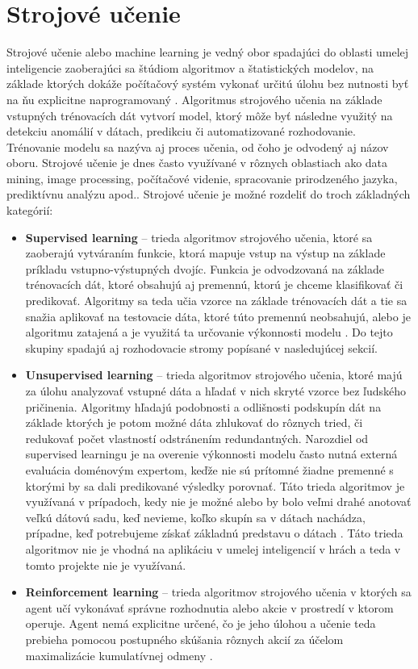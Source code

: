 \documentclass[slovak, master]{diploma}
\begin{document}
\chapter{Strojové učenie}
\label{sec:MachineLearningOverview}
Strojové učenie alebo machine learning je vedný obor spadajúci do oblasti umelej inteligencie zaoberajúci sa štúdiom algoritmov a štatistických modelov, na základe ktorých dokáže počítačový systém vykonať určitú úlohu bez nutnosti byť na ňu explicitne naprogramovaný \cite{mahesh2020machine}. Algoritmus strojového učenia na základe vstupných trénovacích dát vytvorí model, ktorý môže byť následne využitý na detekciu anomálií v dátach, predikciu či automatizované rozhodovanie. Trénovanie modelu sa nazýva aj proces učenia, od čoho je odvodený aj názov oboru. Strojové učenie je dnes často využívané v rôznych oblastiach ako data mining, image processing, počítačové videnie, spracovanie prirodzeného jazyka, prediktívnu analýzu apod.\cite{zhou2021machine}.
Strojové učenie je možné rozdeliť do troch základných kategórií: %
\begin{itemize}
  \item \textbf{Supervised learning} -- trieda algoritmov strojového učenia, ktoré sa zaoberajú vytváraním funkcie, ktorá mapuje vstup na výstup na základe príkladu vstupno-výstupných dvojíc. Funkcia je odvodzovaná na základe trénovacích dát, ktoré obsahujú aj premennú, ktorú je chceme klasifikovať či predikovať. Algoritmy sa teda učia vzorce na základe trénovacích dát a tie sa snažia aplikovať na testovacie dáta, ktoré túto premennú neobsahujú, alebo je algoritmu zatajená a je využitá ta určovanie výkonnosti modelu \cite{mahesh2020machine}. Do tejto skupiny spadajú aj rozhodovacie stromy popísané v nasledujúcej sekcií.
  \item \textbf{Unsupervised learning} -- trieda algoritmov strojového učenia, ktoré majú za úlohu analyzovať vstupné dáta a hľadať v nich skryté vzorce bez ľudského pričinenia. Algoritmy hľadajú podobnosti a odlišnosti podskupín dát na základe ktorých je potom možné dáta zhlukovať do rôznych tried, či redukovať počet vlastností odstránením redundantných. Narozdiel od supervised learningu je na overenie výkonnosti modelu často nutná externá evaluácia doménovým expertom, keďže nie sú prítomné žiadne premenné s ktorými by sa dali predikované výsledky porovnať. Táto trieda algoritmov je využívaná v prípadoch, kedy nie je možné alebo by bolo veľmi drahé anotovať veľkú dátovú sadu, keď nevieme, koľko skupín sa v dátach nachádza, prípadne, keď potrebujeme získať základnú predstavu o dátach \cite{Unsupervised}. Táto trieda algoritmov nie je vhodná na aplikáciu v umelej inteligencií v hrách a teda v tomto projekte nie je využívaná.
  \item \textbf{Reinforcement learning} -- trieda algoritmov strojového učenia v ktorých sa agent učí vykonávať správne rozhodnutia alebo akcie v prostredí v ktorom operuje. Agent nemá explicitne určené, čo je jeho úlohou a učenie teda prebieha pomocou postupného skúšania rôznych akcií za účelom maximalizácie kumulatívnej odmeny \cite{reinforcementLearning}.
\end{itemize}
\end{document}
